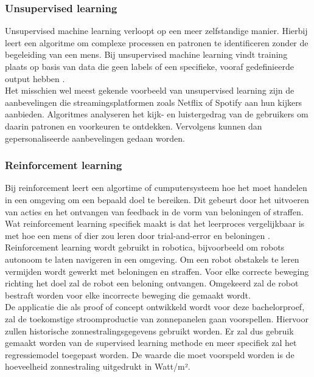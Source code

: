\subsubsection{Unsupervised learning}

Unsupervised machine learning verloopt op een meer zelfstandige manier. Hierbij leert een algoritme om complexe processen en patronen te identificeren zonder de begeleiding van een mens. Bij unsupervised machine learning vindt training plaats op basis van data die geen labels of een specifieke, vooraf gedefinieerde output hebben  \autocite{Brownlee2023}. \\

Het misschien wel meest gekende voorbeeld van unsupervised learning zijn de aanbevelingen die streamingsplatformen zoals Netflix of Spotify aan hun kijkers aanbieden. Algoritmes analyseren het kijk- en luistergedrag van de gebruikers om daarin patronen en voorkeuren te ontdekken. Vervolgens kunnen dan gepersonaliseerde aanbevelingen gedaan worden.

\subsubsection{Reinforcement learning}

Bij reinforcement leert een algortime of cumputersysteem hoe het moet handelen in een omgeving om een bepaald doel te bereiken. Dit gebeurt door het uitvoeren van acties en het ontvangen van feedback in de vorm van beloningen of straffen. Wat reinforcement learning specifiek maakt is dat het leerproces vergelijkbaar is met hoe een mens of dier zou leren door trial-and-error en beloningen \autocite{Efimov2024}. \\

Reinforcement learning wordt gebruikt in robotica, bijvoorbeeld om robots autonoom te laten navigeren in een omgeving. Om een robot obstakels te leren vermijden wordt gewerkt met beloningen en straffen. Voor elke correcte beweging richting het doel zal de robot een beloning ontvangen. Omgekeerd zal de robot bestraft worden voor elke incorrecte beweging die gemaakt wordt. \\

De applicatie die als proof of concept ontwikkeld wordt voor deze bachelorproef, zal de toekomstige stroomproductie van zonnepanelen gaan voorspellen. Hiervoor zullen historische zonnestralingsgegevens gebruikt worden. Er zal dus gebruik gemaakt worden van de supervised learning methode en meer specifiek zal het regressiemodel toegepast worden. De waarde die moet voorspeld worden is de hoeveelheid zonnestraling uitgedrukt in Watt/m².

